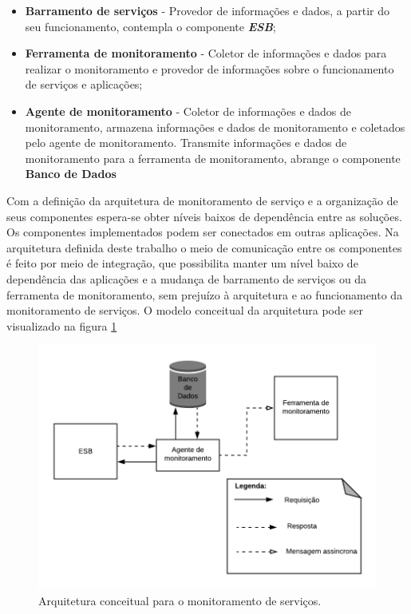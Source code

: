 \begin{itemize}
    \item \textbf{Barramento de serviços} - Provedor de informações e dados, a partir do seu funcionamento, contempla o componente \textbf{\textit{\acrshort{ESB}}}; 
    \item \textbf{Ferramenta de monitoramento} - Coletor de informações e dados para realizar o monitoramento e provedor de informações sobre o funcionamento de serviços e aplicações; 
    \item \textbf{Agente de monitoramento} - Coletor de informações e dados de monitoramento, armazena informações e dados de monitoramento e coletados pelo agente de monitoramento. Transmite informações e dados de monitoramento para a ferramenta de monitoramento, abrange o componente \textbf{Banco de Dados}
\end{itemize}

Com a definição da arquitetura de monitoramento de serviço e a organização de seus componentes espera-se obter níveis baixos de dependência entre as soluções. Os componentes implementados podem ser conectados em outras aplicações. Na arquitetura definida deste trabalho o meio de comunicação entre os componentes é feito por meio de integração, que possibilita manter um nível baixo de dependência das aplicações e a mudança de barramento de serviços ou da ferramenta de monitoramento, sem prejuízo à arquitetura e ao funcionamento da monitoramento de serviços. O modelo conceitual da arquitetura pode ser visualizado na figura \ref{fun:fig:arquitetura_conceitual_monitoramento}

\begin{figure}[H]
	\begin{center}
	\includegraphics[scale = 0.90]{img/Arquitetura_Proposta_Monitoramento.png}
		\caption{Arquitetura conceitual para o monitoramento de serviços.}
		\label{fun:fig:arquitetura_conceitual_monitoramento}
	\end{center}
\end{figure}

